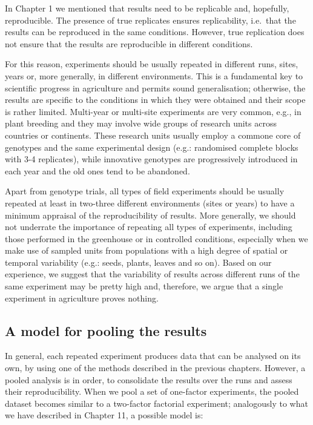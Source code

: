 \documentclass[a4paper,12pt,oneside]{book}
\begin{document}
In Chapter 1 we mentioned that results need to be replicable and, hopefully, reproducible. The presence of true replicates ensures replicability, i.e.~that the results can be reproduced in the same conditions. However, true replication does not ensure that the results are reproducible in different conditions.

For this reason, experiments should be usually repeated in different runs, sites, years or, more generally, in different environments. This is a fundamental key to scientific progress in agriculture and permits sound generalisation; otherwise, the results are specific to the conditions in which they were obtained and their scope is rather limited. Multi-year or multi-site experiments are very common, e.g., in plant breeding and they may involve wide groups of research units across countries or continents. These research units usually employ a commone core of genotypes and the same experimental design (e.g.: randomised complete blocks with 3-4 replicates), while innovative genotypes are progressively introduced in each year and the old ones tend to be abandoned.

Apart from genotype trials, all types of field experiments should be usually repeated at least in two-three different environments (sites or years) to have a minimum appraisal of the reproducibility of results. More generally, we should not underrate the importance of repeating all types of experiments, including those performed in the greenhouse or in controlled conditions, especially when we make use of sampled units from populations with a high degree of spatial or temporal variability (e.g.: seeds, plants, leaves and so on). Based on our experience, we suggest that the variability of results across different runs of the same experiment may be pretty high and, therefore, we argue that a single experiment in agriculture proves nothing.

\hypertarget{a-model-for-pooling-the-results}{%
\subsection{A model for pooling the results}\label{a-model-for-pooling-the-results}}

In general, each repeated experiment produces data that can be analysed on its own, by using one of the methods described in the previous chapters. However, a pooled analysis is in order, to consolidate the results over the runs and assess their reproducibility. When we pool a set of one-factor experiments, the pooled dataset becomes similar to a two-factor factorial experiment; analogously to what we have described in Chapter 11, a possible model is:
\end{document}
